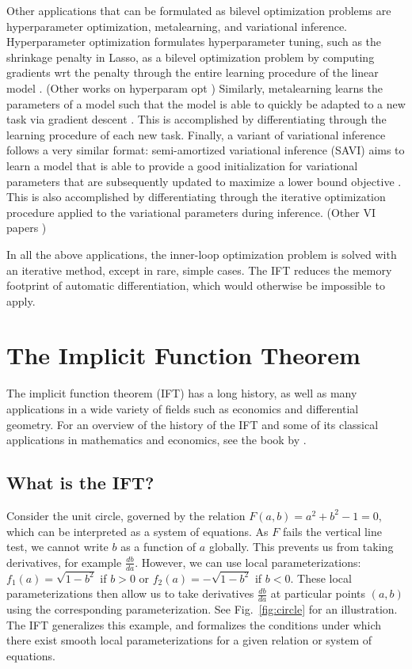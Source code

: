 \documentclass[11pt]{article}
\begin{document}
Other applications that can be formulated as bilevel optimization problems are
hyperparameter optimization, metalearning, and variational inference.
Hyperparameter optimization formulates hyperparameter tuning, such as the shrinkage penalty in Lasso,
as a bilevel optimization problem by computing gradients wrt the penalty through the entire learning procedure
of the linear model \citep{lorraine2019implasso}.
(Other works on hyperparam opt \citep{maclaurin2015reversible,bertrand2020implicit})
Similarly, metalearning learns the parameters of a model such that the model is able to quickly
be adapted to a new task via gradient descent \citep{finn2017maml,rajeswaran2019imaml}.
This is accomplished by differentiating through the learning procedure of each new task.
Finally, a variant of variational inference follows a very similar format:
semi-amortized variational inference (SAVI) aims to learn a model that is able to provide
a good initialization for variational parameters that are subsequently updated
to maximize a lower bound objective \citep{kim2018savi}.
This is also accomplished by differentiating through the iterative optimization procedure
applied to the variational parameters during inference.
(Other VI papers \citep{vi,johnson2017pgm})

In all the above applications, the inner-loop optimization problem is solved
with an iterative method, except in rare, simple cases.
The IFT reduces the memory footprint of automatic differentiation,
which would otherwise be impossible to apply.

\section{The Implicit Function Theorem}
The implicit function theorem (IFT) has a long history, as well as many applications
in a wide variety of fields such as economics and differential geometry.
For an overview of the history of the IFT and some of its classical applications
in mathematics and economics,
see the book by \citet{iftbook}.

\subsection{What is the IFT?}
Consider the unit circle,
governed by the relation $F(a,b) = a^2 + b^2 - 1 = 0$,
which can be interpreted as a system of equations.
As $F$ fails the vertical line test, we cannot write $b$ as a function of $a$ globally.
This prevents us from taking derivatives, for example $\frac{db}{da}$.
However, we can use local parameterizations: $f_1(a) = \sqrt{1-b^2}$ if $b > 0$
or $f_2(a) = -\sqrt{1-b^2}$ if $b<0$.
These local parameterizations then allow us to take derivatives $\frac{db}{da}$
at particular points $(a,b)$ using the corresponding parameterization.
See Fig.~\ref{fig:circle} for an illustration.
The IFT generalizes this example, and formalizes the conditions under which there exist
smooth local parameterizations for a given relation or system of equations.
\end{document}
